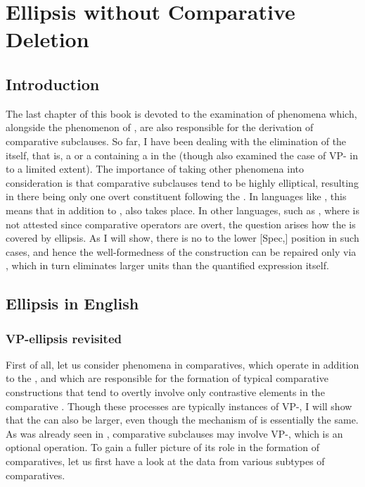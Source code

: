\chapter{Ellipsis without Comparative Deletion} \label{ch:6}
\section{Introduction} \label{sec:6introduction}
The last chapter of this book is devoted to the examination of  phenomena which, alongside the phenomenon of , are also responsible for the derivation of comparative subclauses. So far, I have been dealing with the elimination of the  itself, that is, a  or a  containing a  in the  (though  also examined the case of VP- in  to a limited extent). The importance of taking other  phenomena into consideration is that comparative subclauses tend to be highly elliptical, resulting in there being only one overt constituent following the . In languages like , this means that in addition to ,  also takes place. In other languages, such as , where  is not attested since comparative operators are overt, the question arises how the  is covered by ellipsis. As I will show, there is no  to the lower [Spec,] position in such cases, and hence the well-formedness of the construction can be repaired only via , which in turn eliminates larger units than the quantified expression itself.

\section{Ellipsis in English} \label{sec:6ellipsis}
\subsection{VP-ellipsis revisited} \label{sec:6vpellipsis}
First of all, let us consider  phenomena in  comparatives, which operate in addition to the , and which are responsible for the formation of typical comparative constructions that tend to overtly involve only contrastive elements in the comparative . Though these processes are typically instances of VP-, I will show that the  can also be larger, even though the mechanism of  is essentially the same. 
As was already seen in , comparative subclauses may involve VP-, which is an optional  operation. To gain a fuller picture of its role in the formation of comparatives, let us first have a look at the data from various subtypes of comparatives.

